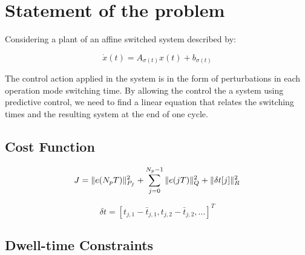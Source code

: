 \section{Statement of the problem}

Considering a plant of an affine switched system described by: 

\begin{equation}
	\label{eq_continuous_time_dynamics}
	\dot{x}(t) = A_{\sigma(t)} x(t) + b_{\sigma(t)}
\end{equation}

The control action applied in the system is in the form of perturbations in each operation mode switching time. By allowing the control the 
a system using predictive control, we need to find a linear equation that relates the switching times and the resulting system at the end of 
one cycle.  

\subsection{Cost Function}

\begin{equation}
	\label{eq_cost_funcion}
	J = \Vert e(N_pT) \Vert^2_{P_f} \\
	+ \sum^{N_p - 1}_{j=0}\Vert e(jT)\Vert ^2_Q + \Vert \delta t[j]\Vert ^2_R
\end{equation}




\begin{equation}
	\delta t = [t_{j,1} - \bar{t}_{j,1}, t_{j,2} - \bar{t}_{j,2}, ...]^T
\end{equation}

\subsection{Dwell-time Constraints}
